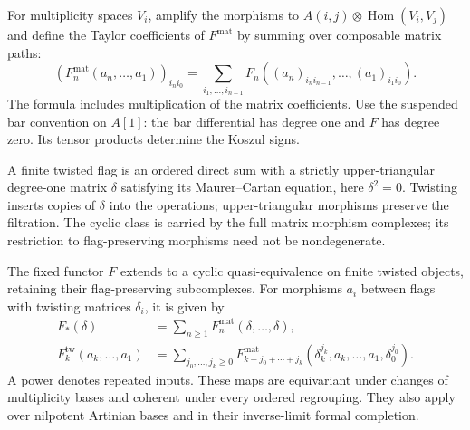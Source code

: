 For multiplicity spaces $V_i$, amplify the morphisms to
$A(i,j)\otimes\operatorname{Hom}(V_i,V_j)$ and define
the Taylor coefficients of $F^{\mathrm{mat}}$ by summing
over composable matrix paths:
\begin{equation}\label{cycompact:eq:matrix-path}
 (F_n^{\mathrm{mat}}(a_n,\ldots,a_1))_{i_ni_0}
 =\sum_{i_1,\ldots,i_{n-1}}
 F_n((a_n)_{i_ni_{n-1}},\ldots,(a_1)_{i_1i_0}).
\end{equation}
The formula includes multiplication of the matrix
coefficients. Use the suspended bar convention on $A[1]$:
the bar differential has degree one and $F$ has degree
zero. Its tensor products determine the Koszul signs.

A finite twisted flag is an ordered direct sum with a
strictly upper-triangular degree-one matrix $\delta$
satisfying its Maurer--Cartan equation, here $\delta^2=0$.
Twisting inserts copies of $\delta$ into the operations;
upper-triangular morphisms preserve the filtration.
The cyclic class is carried by the full matrix morphism
complexes; its restriction to flag-preserving morphisms
need not be nondegenerate.

\begin{theorem}\label{cycompact:thm:cyclic-flags}
The fixed functor $F$ extends to a cyclic quasi-equivalence
on finite twisted objects, retaining their flag-preserving
subcomplexes. For morphisms $a_i$ between flags with
twisting matrices $\delta_i$, it is given by
\begin{align}
 F_*(\delta)&=\sum_{n\geq1}
    F_n^{\mathrm{mat}}(\delta,\ldots,\delta),
       \label{cycompact:eq:twisted-object}\\
 F_k^{\mathrm{tw}}(a_k,\ldots,a_1)
 &=\sum_{j_0,\ldots,j_k\geq0}
 F_{k+j_0+\cdots+j_k}^{\mathrm{mat}}
 (\delta_k^{j_k},a_k,\ldots,a_1,\delta_0^{j_0}).
       \label{cycompact:eq:twisted-morphism}
\end{align}
A power denotes repeated inputs. These maps are equivariant
under changes of multiplicity bases and coherent under
every ordered regrouping. They also apply over nilpotent
Artinian bases and in their inverse-limit formal completion.
\end{theorem}

